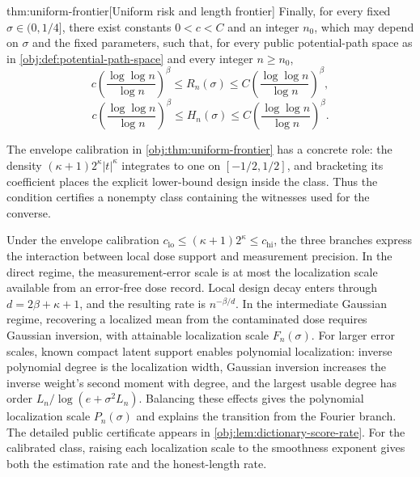 \documentclass[11pt]{article}
\begin{document}
\begin{theoremv}{thm:uniform-frontier}[Uniform risk and length frontier]
Finally, for every fixed \(\sigma\in(0,1/4]\), there exist constants \(0<c<C\) and an integer \(n_0\), which may depend on \(\sigma\) and the fixed parameters, such that, for every public potential-path space as in \cref{obj:def:potential-path-space} and every integer \(n\ge n_0\),
\[
c\left(\frac{\log\log n}{\log n}\right)^\beta
\le R_n(\sigma)\le
C\left(\frac{\log\log n}{\log n}\right)^\beta,
\]
\[
c\left(\frac{\log\log n}{\log n}\right)^\beta
\le H_n(\sigma)\le
C\left(\frac{\log\log n}{\log n}\right)^\beta.
\]
\end{theoremv}

The envelope calibration in \cref{obj:thm:uniform-frontier} has a concrete role: the density \((\kappa+1)2^\kappa|t|^\kappa\) integrates to one on \([-1/2,1/2]\), and bracketing its coefficient places the explicit lower-bound design inside the class. Thus the condition certifies a nonempty class containing the witnesses used for the converse.

Under the envelope calibration \(c_{\mathrm{lo}}\le(\kappa+1)2^\kappa\le c_{\mathrm{hi}}\), the three branches express the interaction between local dose support and measurement precision. In the direct regime, the measurement-error scale is at most the localization scale available from an error-free dose record. Local design decay enters through \(d=2\beta+\kappa+1\), and the resulting rate is \(n^{-\beta/d}\). In the intermediate Gaussian regime, recovering a localized mean from the contaminated dose requires Gaussian inversion, with attainable localization scale \(F_n(\sigma)\). For larger error scales, known compact latent support enables polynomial localization: inverse polynomial degree is the localization width, Gaussian inversion increases the inverse weight's second moment with degree, and the largest usable degree has order \(L_n/\log(e+\sigma^2L_n)\). Balancing these effects gives the polynomial localization scale \(P_n(\sigma)\) and explains the transition from the Fourier branch. The detailed public certificate appears in \cref{obj:lem:dictionary-score-rate}. For the calibrated class, raising each localization scale to the smoothness exponent gives both the estimation rate and the honest-length rate.
\end{document}
